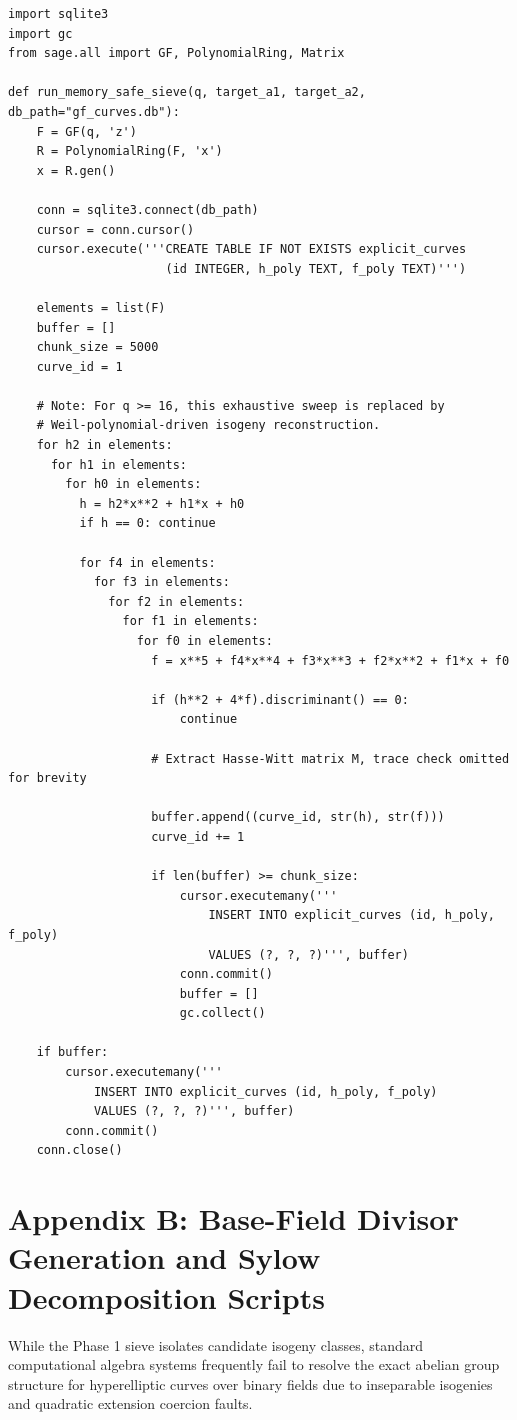 \documentclass[letterpaper, 11pt]{article}
\begin{document}
\begin{lstlisting}
import sqlite3
import gc
from sage.all import GF, PolynomialRing, Matrix

def run_memory_safe_sieve(q, target_a1, target_a2, db_path="gf_curves.db"):
    F = GF(q, 'z')
    R = PolynomialRing(F, 'x')
    x = R.gen()
    
    conn = sqlite3.connect(db_path)
    cursor = conn.cursor()
    cursor.execute('''CREATE TABLE IF NOT EXISTS explicit_curves
                      (id INTEGER, h_poly TEXT, f_poly TEXT)''')
    
    elements = list(F)
    buffer = []
    chunk_size = 5000
    curve_id = 1
    
    # Note: For q >= 16, this exhaustive sweep is replaced by 
    # Weil-polynomial-driven isogeny reconstruction.
    for h2 in elements:
      for h1 in elements:
        for h0 in elements:
          h = h2*x**2 + h1*x + h0
          if h == 0: continue
          
          for f4 in elements:
            for f3 in elements:
              for f2 in elements:
                for f1 in elements:
                  for f0 in elements:
                    f = x**5 + f4*x**4 + f3*x**3 + f2*x**2 + f1*x + f0
                    
                    if (h**2 + 4*f).discriminant() == 0:
                        continue
                        
                    # Extract Hasse-Witt matrix M, trace check omitted for brevity
                    
                    buffer.append((curve_id, str(h), str(f)))
                    curve_id += 1
                    
                    if len(buffer) >= chunk_size:
                        cursor.executemany('''
                            INSERT INTO explicit_curves (id, h_poly, f_poly)
                            VALUES (?, ?, ?)''', buffer)
                        conn.commit()
                        buffer = []
                        gc.collect() 
                        
    if buffer:
        cursor.executemany('''
            INSERT INTO explicit_curves (id, h_poly, f_poly)
            VALUES (?, ?, ?)''', buffer)
        conn.commit()
    conn.close()
\end{lstlisting}

\section{Appendix B: Base-Field Divisor Generation and Sylow Decomposition Scripts}
While the Phase 1 sieve isolates candidate isogeny classes, standard computational algebra systems frequently fail to resolve the exact abelian group structure for hyperelliptic curves over binary fields due to inseparable isogenies and quadratic extension coercion faults. 
\end{document}
